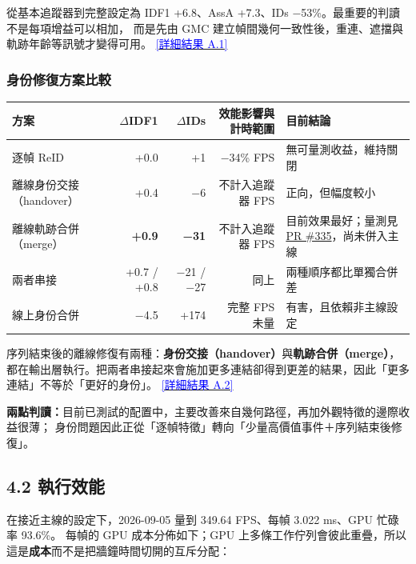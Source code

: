 \documentclass[10pt,a4paper]{ctexart}
\newcommand{\applink}[2]{\hyperref[#1]{\textcolor{Blue}{[#2]}}}
\newcommand{\pr}[1]{\href{https://github.com/raylei50653/saccade/pull/#1}{PR \##1}}
\newcommand{\tighttable}{\small\setlength{\tabcolsep}{4pt}}
\begin{document}
從基本追蹤器到完整設定為 IDF1 +6.8、AssA +7.3、IDs −53\%。最重要的判讀不是每項增益可以相加，
而是先由 GMC 建立幀間幾何一致性後，重連、遮擋與軌跡年齡等訊號才變得可用。
\applink{app:A1}{詳細結果 A.1}

\subsubsection{身份修復方案比較}

\tighttable
\begin{tabularx}{\linewidth}{@{}P{35mm}rrrY@{}}
\toprule
方案 & $\Delta$IDF1 & $\Delta$IDs & 效能影響與計時範圍 & 目前結論\\
\midrule
逐幀 ReID & +0.0 & +1 & −34\% FPS & 無可量測收益，維持關閉\\
離線身份交接（handover） & +0.4 & −6 & 不計入追蹤器 FPS & 正向，但幅度較小\\
離線軌跡合併（merge） & \textbf{+0.9} & \textbf{−31} & 不計入追蹤器 FPS & 目前效果最好；量測見 \pr{335}，尚未併入主線\\
兩者串接 & +0.7 / +0.8 & −21 / −27 & 同上 & 兩種順序都比單獨合併差\\
線上身份合併 & −4.5 & +174 & 完整 FPS 未量 & 有害，且依賴非主線設定\\
\bottomrule
\end{tabularx}

序列結束後的離線修復有兩種：\textbf{身份交接（handover）}與\textbf{軌跡合併（merge）}，
都在輸出層執行。把兩者串接起來會施加更多連結卻得到更差的結果，因此「更多連結」不等於「更好的身份」。
\applink{app:A2}{詳細結果 A.2}

\begin{note}
  \textbf{兩點判讀：}目前已測試的配置中，主要改善來自幾何路徑，再加外觀特徵的邊際收益很薄；
  身份問題因此正從「逐幀特徵」轉向「少量高價值事件＋序列結束後修復」。
\end{note}

\newpage

\subsection{4.2 執行效能}

在接近主線的設定下，2026-09-05 量到 349.64 FPS、每幀 3.022 ms、GPU 忙碌率 93.6\%。
每幀的 GPU 成本分佈如下；GPU 上多條工作佇列會彼此重疊，所以這是\textbf{成本}而不是把牆鐘時間切開的互斥分配：
\end{document}
